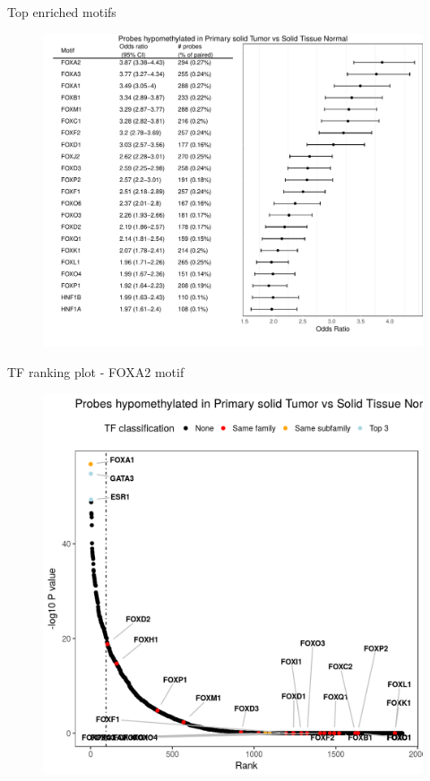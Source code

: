 \documentclass[slidestop,compress,11pt,xcolor=dvipsnames]{beamer}
\begin{document}
\begin{frame}{Top enriched motifs}
 \vspace*{-0.3cm}
 \begin{figure}
  \centering
  \includegraphics[width=0.85\linewidth]{ELMER/BRCA_unsupervise_OR_table.pdf}
 \end{figure}
\end{frame}


\begin{frame}{TF ranking plot - FOXA2 motif}
 \vspace*{-0.3cm}
 \begin{figure}
  \centering
  \includegraphics[width=0.7\linewidth]{ELMER/BRCA_TF_rank.png}
 \end{figure}
\end{frame}
\end{document}
